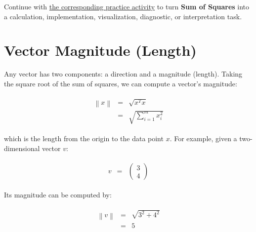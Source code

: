 \documentclass[
  letterpaper,
]{scrbook}
\begin{document}
\begin{tcolorbox}[enhanced jigsaw, arc=.35mm, bottomrule=.15mm, bottomtitle=1mm, breakable, colback=white, colbacktitle=quarto-callout-tip-color!10!white, colframe=quarto-callout-tip-color-frame, coltitle=black, left=2mm, leftrule=.75mm, opacityback=0, opacitybacktitle=0.6, rightrule=.15mm, title=\textcolor{quarto-callout-tip-color}{\faLightbulb}\hspace{0.5em}{Put it into practice}, titlerule=0mm, toprule=.15mm, toptitle=1mm]

Continue with \hyperref[sec-pr-03-sum-of-squares]{the corresponding
practice activity} to turn \textbf{Sum of Squares} into a calculation,
implementation, visualization, diagnostic, or interpretation task.

\end{tcolorbox}

\section{Vector Magnitude (Length)}\label{vector-magnitude-length}

Any vector has two components: a direction and a magnitude (length).
Taking the square root of the sum of squares, we can compute a vector's
magnitude:

\[\begin{aligned}
  \begin{matrix}
    \left\lVert x \right\rVert & = & \sqrt{x^Tx} \\
      & = & \sqrt{\sum_{i=1}^{m} x_i^2}
    \end{matrix}
\end{aligned}\]

which is the length from the origin to the data point \(x\). For
example, given a two-dimensional vector \(v\):

\[\begin{aligned}
  \begin{matrix}
    v & = &
      \begin{pmatrix}
        3 \\ 4
      \end{pmatrix}
  \end{matrix}
\end{aligned}\]

Its magnitude can be computed by:

\[\begin{aligned}
  \begin{matrix}
    \left\lVert v \right\rVert & = & \sqrt{3^2 + 4^2} \\
          & = & 5
    \end{matrix}
\end{aligned}\]
\end{document}
